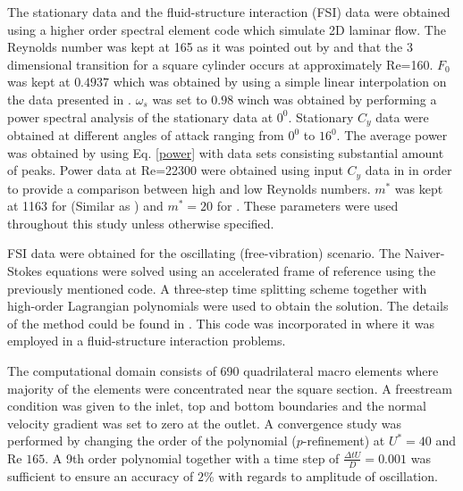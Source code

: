 The stationary data and the fluid-structure interaction (FSI) data were obtained using a higher order spectral element code which simulate 2D laminar flow. The Reynolds number was kept at 165 as it was pointed out by \cite{Sheard2009} and \cite{Tong2008} that the 3 dimensional transition for a square cylinder occurs at approximately Re=160. $F_0$ was kept at $0.4937$ which was obtained by using a simple linear interpolation on the data presented in \cite{Joly2012}. $\omega_s$ was set to $0.98$ winch was obtained by performing a power spectral analysis of the stationary data at $0^0$. Stationary $C_y$ data were obtained at different angles of attack ranging from $0^0$ to $16^0$. The average power was obtained by using Eq. \eqref{power} with data sets consisting substantial amount of peaks. Power data  at Re=22300 were obtained using input $C_y$ data in \cite{Parkinson1964} in order to provide a comparison between high and low Reynolds numbers. $m^*$ was kept at 1163 for  (Similar as \cite{Parkinson1964}) and $m^*=20$ for . These parameters  were used throughout this study unless otherwise specified. 


 FSI data were obtained for the oscillating (free-vibration) scenario. The Naiver-Stokes equations were solved using an accelerated frame of reference using the previously mentioned code. A three-step time splitting scheme together with high-order Lagrangian polynomials were used to obtain the solution. The details of the method could be found in \cite{Thompson2006,Thompson1996a}. This code was incorporated in \cite{Leontini2011,Leontini2007a}  where it was employed in a fluid-structure interaction problems. 
 
 The computational domain consists of 690 quadrilateral macro elements where majority of the elements were concentrated near the square section. A freestream condition was given to the inlet, top and bottom boundaries and the normal velocity gradient was set to zero at the outlet. A convergence study was performed by changing the order of the polynomial ($p$-refinement) at $U^*=40$ and Re $165$. A 9th order polynomial together with a time step of $\frac{\Delta tU}{D}=0.001$ was sufficient to ensure an accuracy of $2\%$ with regards to amplitude of oscillation.  
 

 
 
 

 
 
 
 









